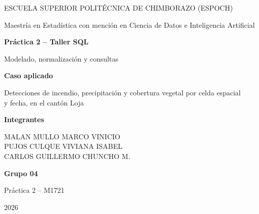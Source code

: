 \documentclass[11pt,a4paper]{article}
\begin{document}
\begin{titlepage}
\centering
\vspace*{1cm}

{\large ESCUELA SUPERIOR POLIT\'ECNICA DE CHIMBORAZO (ESPOCH)\par}
\vspace{0.3cm}
{\large Maestr\'ia en Estad\'istica con menci\'on en Ciencia de Datos e Inteligencia Artificial\par}

\vspace{2.5cm}
{\Huge\bfseries\color{myNewColorA} Pr\'actica 2 -- Taller SQL\par}
\vspace{0.5cm}
{\large Modelado, normalizaci\'on y consultas\par}

\vspace{1.5cm}
\begin{minipage}{0.85\textwidth}
\centering
{\Large\bfseries Caso aplicado\par}
\vspace{0.3cm}
{\large Detecciones de incendio, precipitaci\'on y cobertura vegetal por celda espacial\\
y fecha, en el cant\'on Loja\par}
\end{minipage}

\vspace{2cm}
{\large\bfseries Integrantes\par}
\vspace{0.3cm}
{\large
MALAN MULLO MARCO VINICIO \\
PUJOS CULQUE VIVIANA ISABEL \\
CARLOS GUILLERMO CHUNCHO M. \par}

\vspace{2cm}
{\large\bfseries Grupo 04}\par

\vspace{1.5cm}
{\large Pr\'actica 2 -- M1721 \par}
{\large 2026 \par}

\vfill
\end{titlepage}

\end{document}
